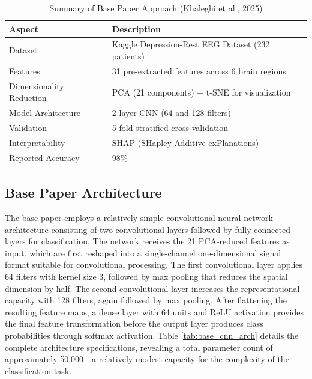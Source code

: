\begin{table}[H]
    \centering
    \small
    \caption{Summary of Base Paper Approach (Khaleghi et al., 2025)}
    \label{tab:base_paper_summary}
    \begin{tabularx}{\textwidth}{|L{3.5cm}|X|}
        \hline
        \textbf{Aspect} & \textbf{Description} \\
        \hline
        Dataset & Kaggle Depression-Rest EEG Dataset (232 patients) \\
        \hline
        Features & 31 pre-extracted features across 6 brain regions \\
        \hline
        Dimensionality Reduction & PCA (21 components) + t-SNE for visualization \\
        \hline
        Model Architecture & 2-layer CNN (64 and 128 filters) \\
        \hline
        Validation & 5-fold stratified cross-validation \\
        \hline
        Interpretability & SHAP (SHapley Additive exPlanations) \\
        \hline
        Reported Accuracy & 98\% \\
        \hline
    \end{tabularx}
\end{table}

\subsection{Base Paper Architecture}

The base paper employs a relatively simple convolutional neural network architecture consisting of two convolutional layers followed by fully connected layers for classification. The network receives the 21 PCA-reduced features as input, which are first reshaped into a single-channel one-dimensional signal format suitable for convolutional processing. The first convolutional layer applies 64 filters with kernel size 3, followed by max pooling that reduces the spatial dimension by half. The second convolutional layer increases the representational capacity with 128 filters, again followed by max pooling. After flattening the resulting feature maps, a dense layer with 64 units and ReLU activation provides the final feature transformation before the output layer produces class probabilities through softmax activation. Table \ref{tab:base_cnn_arch} details the complete architecture specifications, revealing a total parameter count of approximately 50,000---a relatively modest capacity for the complexity of the classification task.

